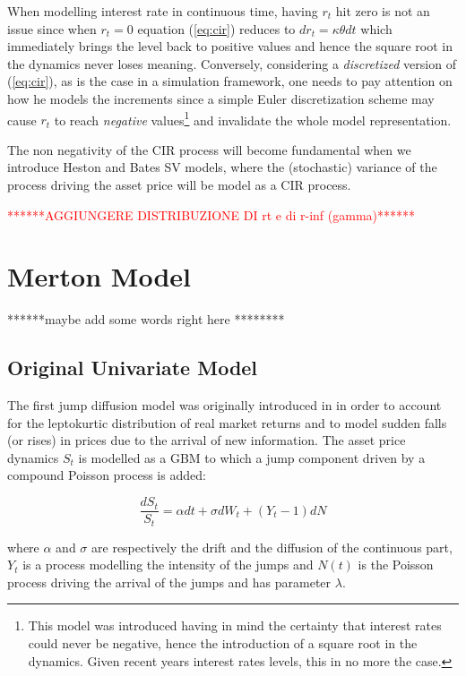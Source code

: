 When modelling interest rate in continuous time, having $r_t$ hit zero is not an issue since when $r_t=0$ equation (\ref{eq:cir}) reduces to $dr_t = \kappa\theta dt$ which immediately brings the level back to positive values and hence the square root in the dynamics never loses meaning. Conversely, considering a \textit{discretized} version of (\ref{eq:cir}), as is the case in a simulation framework, one needs to pay attention on how he models the increments since a simple Euler discretization scheme may cause $r_t$ to reach \textit{negative} values\footnote{This model was introduced having in mind the certainty that interest rates could never be negative, hence the introduction of a square root in the dynamics. Given recent years interest rates levels, this in no more the case.} and invalidate the whole model representation.

The non negativity of the CIR process will become fundamental when we introduce Heston and Bates SV models, where the (stochastic) variance of the process driving the asset price will be model as a CIR process.

\textcolor{red}{******AGGIUNGERE DISTRIBUZIONE DI rt e di r-inf (gamma)******}

\bigskip
\section{Merton Model}

 ******maybe add some words right here ********
\subsection{Original Univariate Model}
The first jump diffusion model was originally introduced in \cite{MERTON1976} in order to account for the leptokurtic distribution of real market returns and to model sudden falls (or rises) in prices due to the arrival of new information.
The asset price dynamics $S_t$ is modelled as a GBM to which a jump component driven by a compound Poisson process is added:

\begin{equation}
\label{merton_model}
\frac{dS_t}{S_t} = \alpha dt + \sigma dW_t  + (Y_t-1)dN
\end{equation}

where $\alpha$ and $\sigma$ are respectively the drift and the diffusion of the continuous part, $Y_t$ is a process modelling the intensity of the jumps and $N(t)$ is the Poisson process driving the arrival of the jumps and has parameter $\lambda$.

